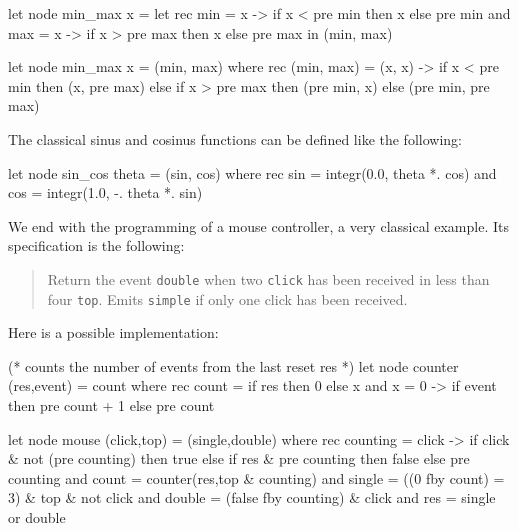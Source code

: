 \documentclass[11pt,titlepage,twoside]{report}
\begin{document}
\begin{runverbatim}
let node min_max x =
  let rec min = x -> if x < pre min then x else pre min
  and max = x -> if x > pre max then x else pre max in
  (min, max)
\end{runverbatim}

\begin{runverbatim}
let node min_max x = (min, max) where
  rec (min, max) = (x, x) -> if x < pre min then (x, pre max)
                             else if x > pre max then (pre min, x)
                             else (pre min, pre max)
\end{runverbatim}

\noindent The classical sinus and cosinus functions can be defined like the
following:
\begin{runverbatim}[continue,include=integr]
let node sin_cos theta = (sin, cos) where
  rec sin = integr(0.0, theta *. cos)
  and cos = integr(1.0, -. theta *. sin)
\end{runverbatim}

We end with the programming of a mouse controller, a very
classical example. Its specification is the following:
\begin{quote}
Return the event \verb-double- when two \verb-click- has been received
in less than four \verb-top-. Emits \verb-simple- if only one click
has been received.
\end{quote}
Here is a possible implementation:
\begin{runverbatim}
(* counts the number of events from the last reset res *)
let node counter (res,event) = count where
  rec count = if res then 0 else x
  and x = 0 -> if event then pre count + 1 else pre count

let node mouse (click,top) = (single,double) where
  rec counting = click -> if click & not (pre counting) then true
                          else if res & pre counting then false
                          else pre counting
  and count = counter(res,top & counting)
  and single = ((0 fby count) = 3) & top & not click
  and double = (false fby counting) & click
  and res = single or double
\end{runverbatim}
\end{document}
